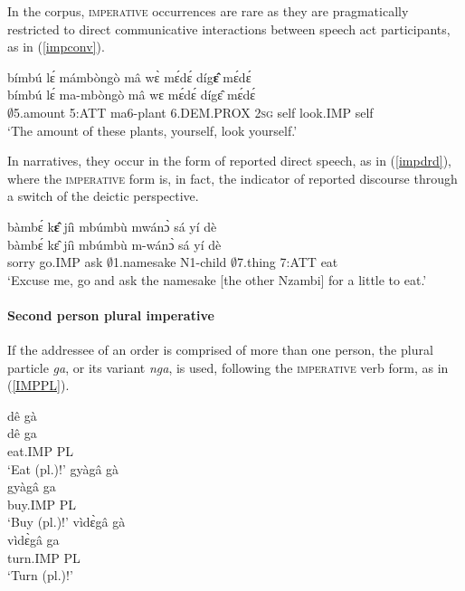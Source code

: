 In the corpus, \textsc{imperative} occurrences are rare  as they are pragmatically restricted to direct communicative interactions between speech act participants, as in (\ref{impconv}).


\begin{exe} 
\ex\label{impconv}
  \glll bímbú lɛ́ mámbòngò mâ wɛ̀ mɛ́dɛ́ díg{\bfseries ɛ̂} mɛ́dɛ́\\
         bímbú lɛ́ ma-mbòngò mâ wɛ mɛ́dɛ́ dígɛ̂ mɛ́dɛ́ \\
       $\emptyset$5.amount 5:ATT ma6-plant 6.DEM.PROX 2\textsc{sg} self look.IMP self   \\
    \trans `The amount of these plants, yourself, look yourself.'
\end{exe}


\noindent In narratives, they occur in the form of reported direct speech, as in (\ref{impdrd}), where the \textsc{imperative} form is, in fact, the indicator of reported discourse through a switch of the deictic perspective.

\begin{exe} 
\ex\label{impdrd}
  \glll  bàmbɛ́ k{\bfseries ɛ̂} jíì mbúmbù mwánɔ̀ sá yí dè  \\
        bàmbɛ́ kɛ̂ jíì mbúmbù m-wánɔ̀ sá yí dè \\
           sorry  go.IMP ask $\emptyset$1.namesake N1-child $\emptyset$7.thing 7:ATT eat  \\
    \trans `Excuse me, go and ask the namesake [the other Nzambi] for a little to eat.'
\end{exe}



 

\paragraph{Second person plural imperative}
If the addressee of an order is comprised of more than one person, the plural particle {\itshape ga}, or its variant {\itshape nga}, is used, following the \textsc{imperative} verb form, as in (\ref{IMPPL}).

\begin{exe}
\ex\label{IMPPL}
\begin{xlist}
\ex 
  \glll dê gà \\
         dê ga \\
         eat.IMP PL\\
    \trans `Eat (pl.)!' 
\ex 
  \glll gyàgâ gà \\
         gyàgâ ga \\
         buy.IMP PL\\
    \trans `Buy (pl.)!' 
\ex 
  \glll vìdɛ̀gâ gà \\
         vìdɛ̀gâ ga \\
         turn.IMP PL\\
    \trans `Turn (pl.)!'
\end{xlist}
\end{exe}



